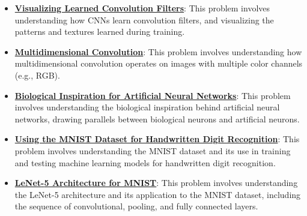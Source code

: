 \documentclass{article}%
\begin{document}
\begin{itemize}[leftmargin=*]
\item \href{https://purdue.brightspace.com/d2l/common/assets/pdfjs-d2l-dist/1.0.14-legacy/web/viewer.html?file=\%2Fcontent\%2Fenforced\%2F1095467-wl.202510.CS.24300.001\%2F09L1-cnn.pdf\%3Fou\%3D1095467\&lang=en-us\&container=d2l-fileviewer-rendered-pdf\&fullscreen=d2l-fileviewer-rendered-pdf-dialog\&height=667#page=18}{\textbf{Visualizing Learned Convolution Filters}}: This problem involves understanding how CNNs learn convolution filters, and visualizing the patterns and textures learned during training.%
\item \href{https://purdue.brightspace.com/d2l/common/assets/pdfjs-d2l-dist/1.0.14-legacy/web/viewer.html?file=\%2Fcontent\%2Fenforced\%2F1095467-wl.202510.CS.24300.001\%2F09L1-cnn.pdf\%3Fou\%3D1095467\&lang=en-us\&container=d2l-fileviewer-rendered-pdf\&fullscreen=d2l-fileviewer-rendered-pdf-dialog\&height=667#page=19}{\textbf{Multidimensional Convolution}}: This problem involves understanding how multidimensional convolution operates on images with multiple color channels (e.g., RGB).%
\item \href{https://purdue.brightspace.com/d2l/common/assets/pdfjs-d2l-dist/1.0.14-legacy/web/viewer.html?file=\%2Fcontent\%2Fenforced\%2F1095467-wl.202510.CS.24300.001\%2F09L1-cnn.pdf\%3Fou\%3D1095467\&lang=en-us\&container=d2l-fileviewer-rendered-pdf\&fullscreen=d2l-fileviewer-rendered-pdf-dialog\&height=667#page=20}{\textbf{Biological Inspiration for Artificial Neural Networks}}: This problem involves understanding the biological inspiration behind artificial neural networks, drawing parallels between biological neurons and artificial neurons.%
\item \href{https://purdue.brightspace.com/d2l/common/assets/pdfjs-d2l-dist/1.0.14-legacy/web/viewer.html?file=\%2Fcontent\%2Fenforced\%2F1095467-wl.202510.CS.24300.001\%2F09L1-cnn.pdf\%3Fou\%3D1095467\&lang=en-us\&container=d2l-fileviewer-rendered-pdf\&fullscreen=d2l-fileviewer-rendered-pdf-dialog\&height=667#page=21}{\textbf{Using the MNIST Dataset for Handwritten Digit Recognition}}: This problem involves understanding the MNIST dataset and its use in training and testing machine learning models for handwritten digit recognition.%
\item \href{https://purdue.brightspace.com/d2l/common/assets/pdfjs-d2l-dist/1.0.14-legacy/web/viewer.html?file=\%2Fcontent\%2Fenforced\%2F1095467-wl.202510.CS.24300.001\%2F09L1-cnn.pdf\%3Fou\%3D1095467\&lang=en-us\&container=d2l-fileviewer-rendered-pdf\&fullscreen=d2l-fileviewer-rendered-pdf-dialog\&height=667#page=22}{\textbf{LeNet{-}5 Architecture for MNIST}}: This problem involves understanding the LeNet-5 architecture and its application to the MNIST dataset, including the sequence of convolutional, pooling, and fully connected layers.%

\end{itemize}
\end{document}
